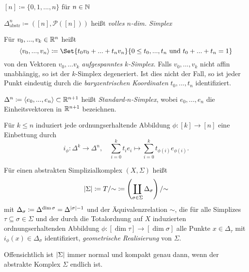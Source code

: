 \documentclass{cheat-sheet}
\begin{document}
\begin{nota}
  $[n] \coloneqq \{ 0, 1, ..., n \}$ für $n \in \mathbb{N}$
\end{nota}

\begin{defn}
  $\Delta^n_{\text{abstr}} \coloneqq ([n], \mathcal{P}([n]))$ heißt \emph{volles $n$-dim. Simplex}
\end{defn}

\begin{defn}
  Für $v_0, ..., v_k \in \mathbb{R}^n$ heißt
  \[ \langle v_0, ..., v_n \rangle \coloneqq \Set{ t_0 v_0 + ... + t_n v_n }{ 0 \leq t_0, ..., t_n \text{ und } t_0 + ... + t_n = 1 } \]
  von den Vektoren $v_0, ... v_k$ \emph{aufgespanntes $k$-Simplex}. Falls $v_0, ..., v_k$ nicht affin unabhängig, so ist der $k$-Simplex degeneriert. Ist dies nicht der Fall, so ist jeder Punkt eindeutig durch die \emph{baryzentrischen Koordinaten} $t_0, ..., t_n$ identifiziert.
\end{defn}

\begin{defn}
  $\Delta^n \coloneqq \langle e_0, ..., e_n \rangle \subset \mathbb{R}^{n+1}$ heißt \emph{Standard-$n$-Simplex}, wobei $e_0, ..., e_n$ die Einheitsvektoren in $\mathbb{R}^{n+1}$ bezeichnen.
\end{defn}

\begin{bem}
  Für $k \leq n$ induziert jede ordnungserhaltende Abbildung $\phi : [k] \to [n]$ eine Einbettung durch
  \[ i_\phi : \Delta^k \to \Delta^n, \quad \sum_{i=0}^k t_i e_i \mapsto \sum_{i=0}^k t_{\phi(i)} e_{\phi(i)}. \]
\end{bem}

\begin{defn}
  Für einen abstrakten Simplizialkomplex $(X, \Sigma)$ heißt
  \[ \lvert\Sigma\rvert \coloneqq T / {\sim} \coloneqq \left( \coprod_{\sigma \in \Sigma} \Delta_\sigma \right) / {\sim} \]
  mit $\Delta_\sigma \coloneqq \Delta^{\dim \sigma} = \Delta^{\lvert\sigma\rvert - 1}$ und der Äquivalenzrelation ${\sim}$, die für alle Simplizes $\tau \subseteq \sigma \in \Sigma$ und der durch die Totalordnung auf $X$ induzierten ordnungserhaltenden Abbildung $\phi : [ \dim \tau ] \to [ \dim \sigma ]$ alle Punkte $x \in \Delta_\tau$ mit $i_\phi(x) \in \Delta_{\sigma}$ identifiziert, \emph{geometrische Realisierung} von $\Sigma$.
\end{defn}

\begin{bem}
  Offensichtlich ist $\lvert\Sigma\rvert$ immer normal und kompakt genau dann, wenn der abstrakte Komplex $\Sigma$ endlich ist.
\end{bem}
\end{document}
